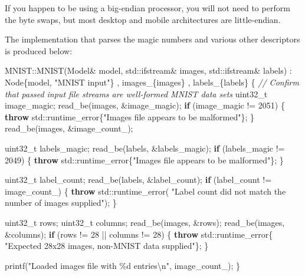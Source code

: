 \documentclass[
]{article}
\newenvironment{Shaded}{}{}
\newcommand{\BuiltInTok}[1]{#1}
\newcommand{\CommentTok}[1]{\textcolor[rgb]{0.38,0.63,0.69}{\textit{#1}}}
\newcommand{\ControlFlowTok}[1]{\textcolor[rgb]{0.00,0.44,0.13}{\textbf{#1}}}
\newcommand{\DataTypeTok}[1]{\textcolor[rgb]{0.56,0.13,0.00}{#1}}
\newcommand{\DecValTok}[1]{\textcolor[rgb]{0.25,0.63,0.44}{#1}}
\newcommand{\NormalTok}[1]{#1}
\newcommand{\SpecialCharTok}[1]{\textcolor[rgb]{0.25,0.44,0.63}{#1}}
\newcommand{\StringTok}[1]{\textcolor[rgb]{0.25,0.44,0.63}{#1}}
\newcommand{\VariableTok}[1]{\textcolor[rgb]{0.10,0.09,0.49}{#1}}
\begin{document}
If you happen to be using a big-endian processor, you will not need to
perform the byte swaps, but most desktop and mobile architectures are
little-endian.

The implementation that parses the magic numbers and various other
descriptors is produced below:

\begin{Shaded}
\begin{Highlighting}[]
\NormalTok{MNIST::MNIST(Model\& model, }\BuiltInTok{std::}\NormalTok{ifstream\& images, }\BuiltInTok{std::}\NormalTok{ifstream\& labels)}
\NormalTok{    : Node\{model, }\StringTok{"MNIST input"}\NormalTok{\}}
\NormalTok{    , }\VariableTok{images\_}\NormalTok{\{images\}}
\NormalTok{    , }\VariableTok{labels\_}\NormalTok{\{labels\}}
\NormalTok{\{}
    \CommentTok{// Confirm that passed input file streams are well{-}formed MNIST data sets}
    \DataTypeTok{uint32\_t}\NormalTok{ image\_magic;}
\NormalTok{    read\_be(images, \&image\_magic);}
    \ControlFlowTok{if}\NormalTok{ (image\_magic != }\DecValTok{2051}\NormalTok{)}
\NormalTok{    \{}
        \ControlFlowTok{throw} \BuiltInTok{std::}\NormalTok{runtime\_error\{}\StringTok{"Images file appears to be malformed"}\NormalTok{\};}
\NormalTok{    \}}
\NormalTok{    read\_be(images, \&}\VariableTok{image\_count\_}\NormalTok{);}

    \DataTypeTok{uint32\_t}\NormalTok{ labels\_magic;}
\NormalTok{    read\_be(labels, \&labels\_magic);}
    \ControlFlowTok{if}\NormalTok{ (labels\_magic != }\DecValTok{2049}\NormalTok{)}
\NormalTok{    \{}
        \ControlFlowTok{throw} \BuiltInTok{std::}\NormalTok{runtime\_error\{}\StringTok{"Images file appears to be malformed"}\NormalTok{\};}
\NormalTok{    \}}

    \DataTypeTok{uint32\_t}\NormalTok{ label\_count;}
\NormalTok{    read\_be(labels, \&label\_count);}
    \ControlFlowTok{if}\NormalTok{ (label\_count != }\VariableTok{image\_count\_}\NormalTok{)}
\NormalTok{    \{}
        \ControlFlowTok{throw} \BuiltInTok{std::}\NormalTok{runtime\_error(}
            \StringTok{"Label count did not match the number of images supplied"}\NormalTok{);}
\NormalTok{    \}}

    \DataTypeTok{uint32\_t}\NormalTok{ rows;}
    \DataTypeTok{uint32\_t}\NormalTok{ columns;}
\NormalTok{    read\_be(images, \&rows);}
\NormalTok{    read\_be(images, \&columns);}
    \ControlFlowTok{if}\NormalTok{ (rows != }\DecValTok{28}\NormalTok{ || columns != }\DecValTok{28}\NormalTok{)}
\NormalTok{    \{}
        \ControlFlowTok{throw} \BuiltInTok{std::}\NormalTok{runtime\_error\{}
            \StringTok{"Expected 28x28 images, non{-}MNIST data supplied"}\NormalTok{\};}
\NormalTok{    \}}

\NormalTok{    printf(}\StringTok{"Loaded images file with }\SpecialCharTok{\%d}\StringTok{ entries}\SpecialCharTok{\textbackslash{}n}\StringTok{"}\NormalTok{, }\VariableTok{image\_count\_}\NormalTok{);}
\NormalTok{\}}
\end{Highlighting}
\end{Shaded}
\end{document}
